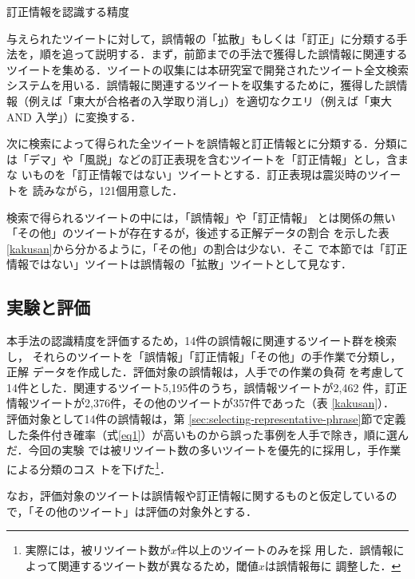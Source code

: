 \documentclass[japanese]{jnlp_1.4}
\begin{document}
\begin{table}[b]
 \caption{訂正情報を認識する精度}
 \label{kakusan}

\end{table}

与えられたツイートに対して，誤情報の「拡散」もしくは「訂正」に分類する手
法を，順を追って説明する．まず，前節までの手法で獲得した誤情報に関連する
ツイートを集める．ツイートの収集には本研究室で開発されたツイート全文検索
システムを用いる．誤情報に関連するツイートを収集するために，獲得した誤情
報（例えば「東大が合格者の入学取り消し」）を適切なクエリ（例えば「東大
AND 入学」）に変換する．

次に検索によって得られた全ツイートを誤情報と訂正情報とに分類する．分類に
は「デマ」や「風説」などの訂正表現を含むツイートを「訂正情報」とし，含まな
いものを「訂正情報ではない」ツイートとする．訂正表現は震災時のツイートを
読みながら，121個用意した．

検索で得られるツイートの中には，「誤情報」や「訂正情報」
とは関係の無い「その他」のツイートが存在するが，後述する正解データの割合
を示した表\ref{kakusan}から分かるように，「その他」の割合は少ない．そこ
で本節では「訂正情報ではない」ツイートは誤情報の「拡散」ツイートとして見なす．


\subsection{実験と評価}

本手法の認識精度を評価するため，14件の誤情報に関連するツイート群を検索し，
それらのツイートを「誤情報」「訂正情報」「その他」の手作業で分類し，正解
データを作成した．評価対象の誤情報は，人手での作業の負荷
を考慮して14件とした．関連するツイート5,195件のうち，誤情報ツイートが2,462
件，訂正情報ツイートが2,376件，その他のツイートが357件であった（表
\ref{kakusan}）． 評価対象として14件の誤情報は，第
\ref{sec:selecting-representative-phrase}節で定義した条件付き確率（式\ref{eq1}）が高いものから誤った事例を人手で除き，順に選んだ．今回の実験
では被リツイート数の多いツイートを優先的に採用し，手作業による分類のコス
トを下げた\footnote{実際には，被リツイート数が$x$件以上のツイートのみを採
用した．誤情報によって関連するツイート数が異なるため，閾値$x$は誤情報毎に
調整した．}．

なお，評価対象のツイートは誤情報や訂正情報に関するものと仮定しているので，「その他のツイート」は評価の対象外とする．
\end{document}
